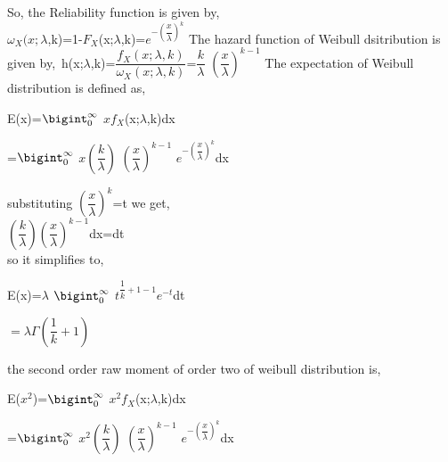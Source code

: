 \documentclass[12pt,a4paper,oneside]{article}
\begin{document}
\vspace{2cm}
So, the Reliability function is given by,\\
$\omega_{X}(x;{\lambda}$,k)=1-$F_{X}$(x;${\lambda}$,k)=$e^{-\left(\dfrac{x}{\lambda}\right)^{k}}$\newline\newline\newline
The hazard function of Weibull dsitribution is given by,\
h(x;${\lambda}$,k)=$\dfrac{f_{X}(x;{\lambda},k)}{\omega_{X}(x;{\lambda},k)}$=$\dfrac{k}{{\lambda}}$ $\left(\dfrac{x}{\lambda}\right)^{k-1}$
\newline\newline\newline The expectation of Weibull distribution is defined as,\\
\begin{center}
\hspace{5cm}E(x)=$\bigint_{0}^{\infty}$ $xf_{X}$(x;${\lambda}$,k)dx\newline\newline
\begin{singlespace}
\hspace{5.5cm}=$\bigint_{0}^{\infty}$ $x\left(\dfrac{k}{{\lambda}}\right)$ $\left(\dfrac{x}{\lambda}\right)^{k-1}$ $e^{-\left(\dfrac{x}{\lambda}\right)^{k}}$dx
\end{singlespace}
\end{center}\newpage
substituting $\left(\dfrac{x}{{\lambda}}\right)^{k}$=t we get,\\
\newline
\hspace{2cm}$\left(\dfrac{k}{\lambda}\right)\left(\dfrac{x}{{\lambda}}\right)^{k-1}$dx=dt\\
\newline so it simplifies to,
\begin{center}
\hspace{3cm}E(x)=${\lambda}$ $\bigint_{0}^{\infty}$ $t^{\dfrac{1}{k}+1-1}e^{-t}$dt\\
\begin{singlespace}
\hspace{2cm}$=\boxed{{\lambda}\Gamma\left(\dfrac{1}{k}+1\right)}$
\end{singlespace}
\end{center}
\vspace{2cm}the second order raw moment of order two of weibull distribution is,\\
\begin{center}
\hspace{5cm}E($x^{2}$)=$\bigint_{0}^{\infty}$ $x^{2}f_{X}$(x;${\lambda}$,k)dx\newline\newline
\begin{singlespace}
\hspace{5.7cm}=$\bigint_{0}^{\infty}$ $x^{2}\left(\dfrac{k}{{\lambda}}\right)$ $\left(\dfrac{x}{\lambda}\right)^{k-1}$ $e^{-\left(\dfrac{x}{\lambda}\right)^{k}}$dx
\end{singlespace}
\end{center}
\end{document}
